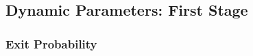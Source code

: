 \documentclass[12pt]{article}
\begin{document}

\pagebreak

\subsection{Dynamic Parameters: First Stage}


\subsubsection{Exit Probability}
\end{document}
